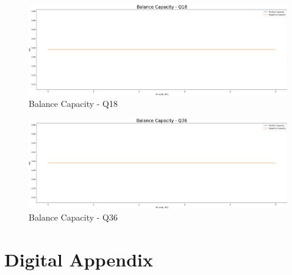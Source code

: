 \begin{figure}[H]
	\includegraphics[width=1\linewidth]{pictures/results/Balance Capacity - Q18.png}
	\caption{Balance Capacity - Q18}
	\label{fig:Balance Capacity - Q18}
\end{figure}

\begin{figure}[H]
	\includegraphics[width=1\linewidth]{pictures/results/Balance Capacity - Q36.png}
	\caption{Balance Capacity - Q36}
	\label{fig:Balance Capacity - Q36}
\end{figure}







\section{Digital Appendix}


